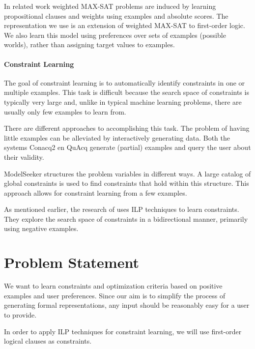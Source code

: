 \documentclass[letterpaper]{article}
\theoremstyle{definition}
\begin{document}
In related work \cite{campigotto2011active} weighted MAX-SAT problems are induced by learning propositional clauses and weights using examples and absolute scores.
The representation we use is an extension of weighted MAX-SAT to first-order logic.
We also learn this model using preferences over sets of examples (possible worlds), rather than assigning target values to examples.

\paragraph{Constraint Learning}
The goal of constraint learning is to automatically identify constraints in one or multiple examples.
This task is difficult because the search space of constraints is typically very large and, unlike in typical machine learning problems, there are usually only few examples to learn from.

There are different approaches to accomplishing this task.
The problem of having little examples can be alleviated by interactively generating data.
Both the systems Conacq2 \cite{bessiere2007query} en QuAcq \cite{bessiere2013constraint} generate (partial) examples and query the user about their validity.

ModelSeeker \cite{Beldiceanu:ModelSeeker} structures the problem variables in different ways.
A large catalog of global constraints is used to find constraints that hold within this structure.
This approach allows for constraint learning from a few examples.

As mentioned earlier, the research of \cite{Lallouet:LearningCP} uses ILP techniques to learn constraints.
They explore the search space of constraints in a bidirectional manner, primarily using negative examples.


\section{Problem Statement}
\label{sec:problem}
We want to learn constraints and optimization criteria based on positive examples and user preferences.
Since our aim is to simplify the process of generating formal representations, any input should be reasonably easy for a user to provide.

In order to apply ILP techniques for constraint learning, we will use first-order logical clauses as constraints.
\end{document}
